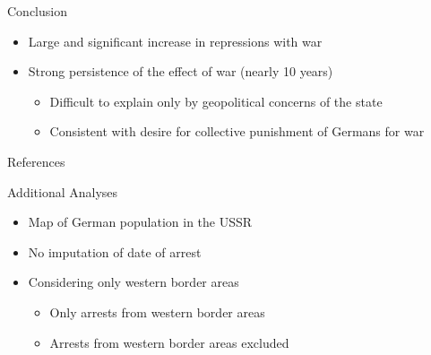 \documentclass[11pt]{beamer}
\begin{document}
\begin{frame}{Conclusion}
\begin{itemize}
    \item Large and significant increase in repressions with war
    \item Strong persistence of the effect of war (nearly 10 years)
    \begin{itemize}
        \item Difficult to explain only by geopolitical concerns of the state
        \item Consistent with desire for collective punishment of Germans for war
    \end{itemize}
    
\end{itemize}

\end{frame}



\appendix

\begin{frame}[allowframebreaks]{References}
\printbibliography
\end{frame}

\begin{frame}[label=add_content]{Additional Analyses}
\begin{itemize}
    \item Map of German population in the USSR \hyperlink{map_counts}{}
    \item No imputation of date of arrest
    \hyperlink{did_no_date_imputation}{} 
    \hyperlink{sc_no_date_imputation}{} 
    \item Considering only western border areas 
    \begin{itemize}
        \item   Only arrests from western border areas 
        \hyperlink{did_border_area_west}{} 
      \hyperlink{sc_border_area_west}{} 
        \item Arrests from western border areas excluded
         \hyperlink{did_non_border_area_west}{} 
      \hyperlink{sc_non_border_area_west}{} 
        
    \end{itemize}
\end{itemize}
\end{frame}
\end{document}
